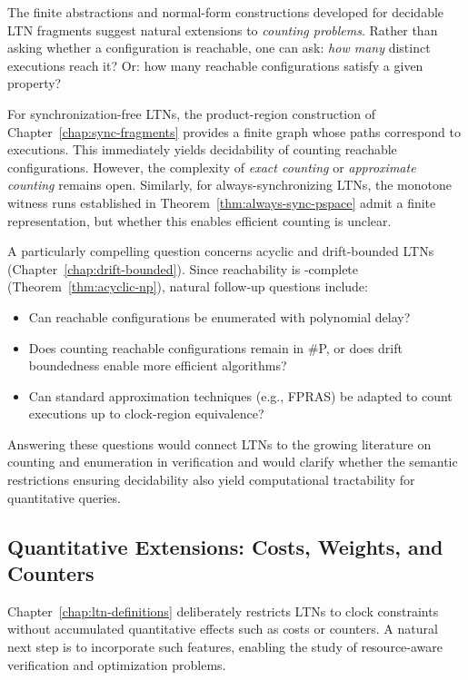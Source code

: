 The finite abstractions and normal-form constructions developed for decidable LTN fragments suggest natural extensions to \emph{counting problems}. Rather than asking whether a configuration is reachable, one can ask: \emph{how many} distinct executions reach it? Or: how many reachable configurations satisfy a given property?

For synchronization-free LTNs, the product-region construction of Chapter~\ref{chap:sync-fragments} provides a finite graph whose paths correspond to executions. This immediately yields decidability of counting reachable configurations. However, the complexity of \emph{exact counting} or \emph{approximate counting} remains open. Similarly, for always-synchronizing LTNs, the monotone witness runs established in Theorem~\ref{thm:always-sync-pspace} admit a finite representation, but whether this enables efficient counting is unclear.

A particularly compelling question concerns acyclic and drift-bounded LTNs (Chapter~\ref{chap:drift-bounded}). Since reachability is \NP-complete (Theorem~\ref{thm:acyclic-np}), natural follow-up questions include:
\begin{itemize}
\item Can reachable configurations be enumerated with polynomial delay?
\item Does counting reachable configurations remain in \#P, or does drift boundedness enable more efficient algorithms?
\item Can standard approximation techniques (e.g., FPRAS) be adapted to count executions up to clock-region equivalence?
\end{itemize}

Answering these questions would connect LTNs to the growing literature on counting and enumeration in verification and would clarify whether the semantic restrictions ensuring decidability also yield computational tractability for quantitative queries.

\subsection{Quantitative Extensions: Costs, Weights, and Counters}

Chapter~\ref{chap:ltn-definitions} deliberately restricts LTNs to clock constraints without accumulated quantitative effects such as costs or counters. A natural next step is to incorporate such features, enabling the study of resource-aware verification and optimization problems.

